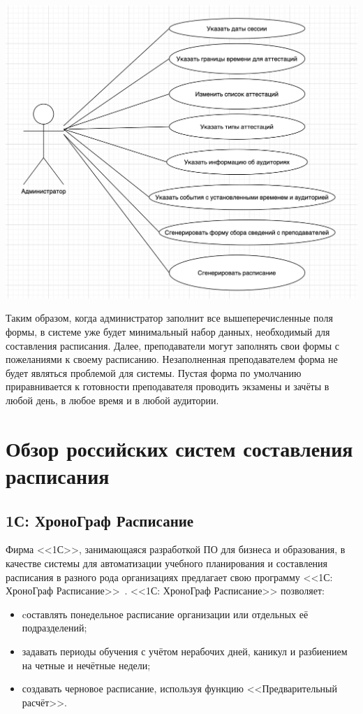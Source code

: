\begin{minipage}{\textwidth}
	\centering
	\vspace{\mfloatsep} %
	\includegraphics[keepaspectratio=true,scale=0.6] {my_folder/images//usecase2}
	\label{fig:usecse2}  
	\vspace{\mfloatsep} %
\end{minipage}

Таким образом, когда администратор заполнит все вышеперечисленные поля формы, в системе уже будет минимальный набор данных, необходимый для составления расписания. 
Далее, преподаватели могут заполнять свои формы с пожеланиями к своему расписанию. Незаполненная преподавателем форма не будет являться проблемой для системы. Пустая форма по умолчанию приравнивается к готовности преподавателя проводить экзамены и зачёты в любой день, в любое время и в любой аудитории. 

\section{Обзор российских систем составления расписания} \label{ch1:sec2}

\subsection{1С: ХроноГраф Расписание} 
Фирма <<1С>>, занимающаяся разработкой ПО для бизнеса и образования, в качестве системы для автоматизации учебного планирования и составления расписания в разного рода организациях предлагает свою программу <<1С: ХроноГраф Расписание>>~\cite{1с}.
<<1С: ХроноГраф Расписание>> позволяет:
\begin{itemize}
	\item cоставлять понедельное расписание организации или отдельных её подразделений;
	\item задавать периоды обучения с учётом нерабочих дней, каникул и разбиением на четные и нечётные недели;
	\item создавать черновое расписание, используя функцию <<Предварительный расчёт>>.
\end{itemize}

